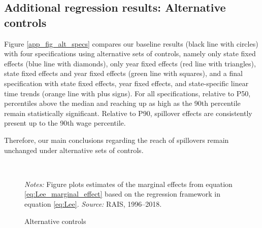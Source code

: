 \clearpage
\subsection{Additional regression results: Alternative controls\label{app_subsec_alt_controls}}

Figure \ref{app_fig_alt_specs} compares our baseline results (black line with circles) with four specifications using alternative sets of controls, namely only state fixed effects (blue line with diamonds), only year fixed effects (red line with triangles), state fixed effects and year fixed effects (green line with squares), and a final specification with state fixed effects, year fixed effects, and state-specific linear time trends (orange line with plus signs). For all specifications, relative to P50, percentiles above the median and reaching up as high as the 90th percentile remain statistically significant. Relative to P90, spillover effects are consistently present up to the 90th wage percentile.

Therefore, our main conclusions regarding the reach of spillovers remain unchanged under alternative sets of controls.

\begin{figure}[!htb]
  \centering
  \caption{\label{app_fig_alt_controls}Alternative controls}
  \prefigvspace
  \hspace*{\fill}%
  \centerhfill[\qquad\qquad\qquad\qquad\qquad]
  \hspace*{\fill}
  \\
  \postfigvspace
  \begin{minipage}[t]{1\columnwidth}%
    \begin{spacing}{0.75}
      \emph{\scriptsize{}Notes:}{\scriptsize{} Figure plots estimates of the marginal effects from equation \eqref{eq:Lee_marginal_effect} based on the regression framework in equation \eqref{eq:Lee}. %
      \emph{\scriptsize{}Source: } RAIS, 1996--2018.}
    \end{spacing}
  \end{minipage}
\end{figure}




